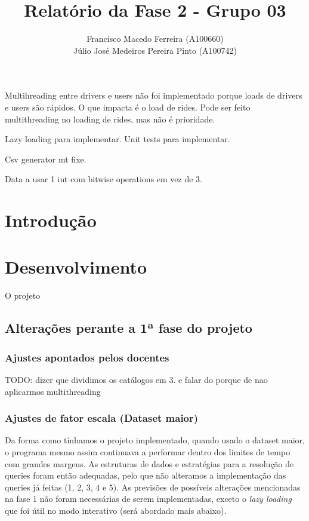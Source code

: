 \documentclass{article}
\title{Relatório da Fase 2 - Grupo 03}
\author{Francisco Macedo Ferreira (A100660)\\Júlio José Medeiros Pereira Pinto (A100742)}
\begin{document}
  
    \maketitle
    Multihreading entre drivers e users não foi implementado porque loads de drivers e users são rápidos.
    O que impacta é o load de rides.
    Pode ser feito multithreading no loading de rides, mas não é prioridade.

    Lazy loading para implementar.
    Unit tests para implementar.

    Csv generator mt fixe.

    Data a usar 1 int com bitwise operations em vez de 3.

    \section{Introdução}
    \lipsum[1]
    
    \section{Desenvolvimento}
    O projeto 
    \subsection{Alterações perante a 1ª fase do projeto}
        \subsubsection{Ajustes apontados pelos docentes}
            TODO: dizer que dividimos os catálogos em 3. e falar 
            do porque de nao aplicarmos multithreading

        \subsubsection{Ajustes de fator escala (Dataset maior)}
            Da forma como tínhamos o projeto implementado, quando 
            usado o dataset maior, o programa mesmo assim continuava
            a performar dentro dos limites de tempo com grandes 
            margens. As estruturas de dados e estratégias para
            a resolução de queries foram então adequadas, pelo que
            não alteramos a implementação das queries já feitas
            (1, 2, 3, 4 e 5). As previsões de possíveis alterações
            mencionadas na fase 1 não foram necessárias de serem
            implementadas, exceto o \emph{lazy loading} que foi
            útil no modo interativo (será abordado mais abaixo).
        
\end{document}
